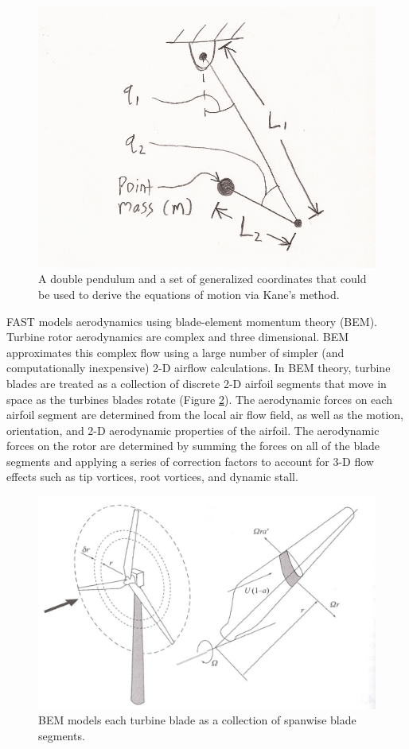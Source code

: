 \begin{figure}[ht]
	\centering
		\includegraphics[width=.5\linewidth]{Figures/AppendixAFigures/figA-2.png}
	\caption{A double pendulum and a set of generalized coordinates that could be used to derive the equations of motion via Kane's method.}
	\label{figA-2}
\end{figure}


FAST models aerodynamics using blade-element momentum theory (BEM). Turbine rotor aerodynamics are complex and three dimensional. BEM approximates this complex flow using a large number of simpler (and computationally inexpensive) 2-D airflow calculations. In BEM theory, turbine blades are treated as a collection of discrete 2-D airfoil segments that move in space as the turbines blades rotate (Figure \ref{figA-3}). The aerodynamic forces on each airfoil segment are determined from the local air flow field, as well as the motion, orientation, and 2-D aerodynamic properties of the airfoil. The aerodynamic forces on the rotor are determined by summing the forces on all of the blade segments and applying a series of correction factors to account for 3-D flow effects such as tip vortices, root vortices, and dynamic stall. 

\begin{figure}[ht]
	\centering
		\includegraphics[width=.75\linewidth]{Figures/AppendixAFigures/figA-3.png}
	\caption{BEM models each turbine blade as a collection of spanwise blade segments.\cite{burton2011}}
	\label{figA-3}
\end{figure}

